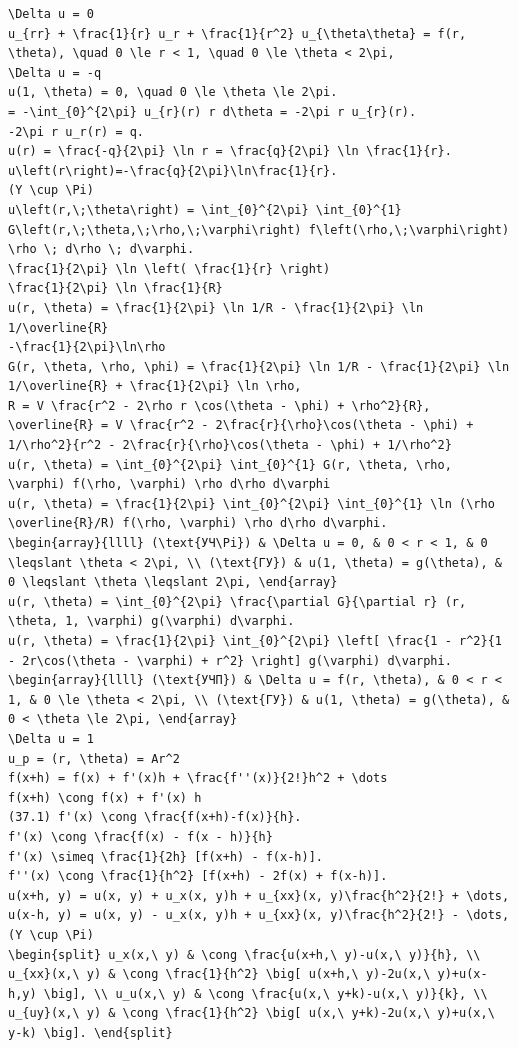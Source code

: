 \documentclass[
  ukrainian,
]{article}
\begin{document}
\begin{verbatim}
\Delta u = 0
u_{rr} + \frac{1}{r} u_r + \frac{1}{r^2} u_{\theta\theta} = f(r, \theta), \quad 0 \le r < 1, \quad 0 \le \theta < 2\pi,
\Delta u = -q
u(1, \theta) = 0, \quad 0 \le \theta \le 2\pi.
= -\int_{0}^{2\pi} u_{r}(r) r d\theta = -2\pi r u_{r}(r).
-2\pi r u_r(r) = q.
u(r) = \frac{-q}{2\pi} \ln r = \frac{q}{2\pi} \ln \frac{1}{r}.
u\left(r\right)=-\frac{q}{2\pi}\ln\frac{1}{r}.
(Y \cup \Pi)
u\left(r,\;\theta\right) = \int_{0}^{2\pi} \int_{0}^{1} G\left(r,\;\theta,\;\rho,\;\varphi\right) f\left(\rho,\;\varphi\right) \rho \; d\rho \; d\varphi.
\frac{1}{2\pi} \ln \left( \frac{1}{r} \right)
\frac{1}{2\pi} \ln \frac{1}{R}
u(r, \theta) = \frac{1}{2\pi} \ln 1/R - \frac{1}{2\pi} \ln 1/\overline{R}
-\frac{1}{2\pi}\ln\rho
G(r, \theta, \rho, \phi) = \frac{1}{2\pi} \ln 1/R - \frac{1}{2\pi} \ln 1/\overline{R} + \frac{1}{2\pi} \ln \rho,
R = V \frac{r^2 - 2\rho r \cos(\theta - \phi) + \rho^2}{R},
\overline{R} = V \frac{r^2 - 2\frac{r}{\rho}\cos(\theta - \phi) + 1/\rho^2}{r^2 - 2\frac{r}{\rho}\cos(\theta - \phi) + 1/\rho^2}
u(r, \theta) = \int_{0}^{2\pi} \int_{0}^{1} G(r, \theta, \rho, \varphi) f(\rho, \varphi) \rho d\rho d\varphi
u(r, \theta) = \frac{1}{2\pi} \int_{0}^{2\pi} \int_{0}^{1} \ln (\rho \overline{R}/R) f(\rho, \varphi) \rho d\rho d\varphi.
\begin{array}{llll} (\text{УЧ\Pi}) & \Delta u = 0, & 0 < r < 1, & 0 \leqslant \theta < 2\pi, \\ (\text{ГУ}) & u(1, \theta) = g(\theta), & 0 \leqslant \theta \leqslant 2\pi, \end{array}
u(r, \theta) = \int_{0}^{2\pi} \frac{\partial G}{\partial r} (r, \theta, 1, \varphi) g(\varphi) d\varphi.
u(r, \theta) = \frac{1}{2\pi} \int_{0}^{2\pi} \left[ \frac{1 - r^2}{1 - 2r\cos(\theta - \varphi) + r^2} \right] g(\varphi) d\varphi.
\begin{array}{llll} (\text{УЧП}) & \Delta u = f(r, \theta), & 0 < r < 1, & 0 \le \theta < 2\pi, \\ (\text{ГУ}) & u(1, \theta) = g(\theta), & 0 < \theta \le 2\pi, \end{array}
\Delta u = 1
u_p = (r, \theta) = Ar^2
f(x+h) = f(x) + f'(x)h + \frac{f''(x)}{2!}h^2 + \dots
f(x+h) \cong f(x) + f'(x) h
(37.1) f'(x) \cong \frac{f(x+h)-f(x)}{h}.
f'(x) \cong \frac{f(x) - f(x - h)}{h}
f'(x) \simeq \frac{1}{2h} [f(x+h) - f(x-h)].
f''(x) \cong \frac{1}{h^2} [f(x+h) - 2f(x) + f(x-h)].
u(x+h, y) = u(x, y) + u_x(x, y)h + u_{xx}(x, y)\frac{h^2}{2!} + \dots,
u(x-h, y) = u(x, y) - u_x(x, y)h + u_{xx}(x, y)\frac{h^2}{2!} - \dots,
(Y \cup \Pi)
\begin{split} u_x(x,\ y) & \cong \frac{u(x+h,\ y)-u(x,\ y)}{h}, \\ u_{xx}(x,\ y) & \cong \frac{1}{h^2} \big[ u(x+h,\ y)-2u(x,\ y)+u(x-h,y) \big], \\ u_u(x,\ y) & \cong \frac{u(x,\ y+k)-u(x,\ y)}{k}, \\ u_{uy}(x,\ y) & \cong \frac{1}{h^2} \big[ u(x,\ y+k)-2u(x,\ y)+u(x,\ y-k) \big]. \end{split}

\end{verbatim}
\end{document}
